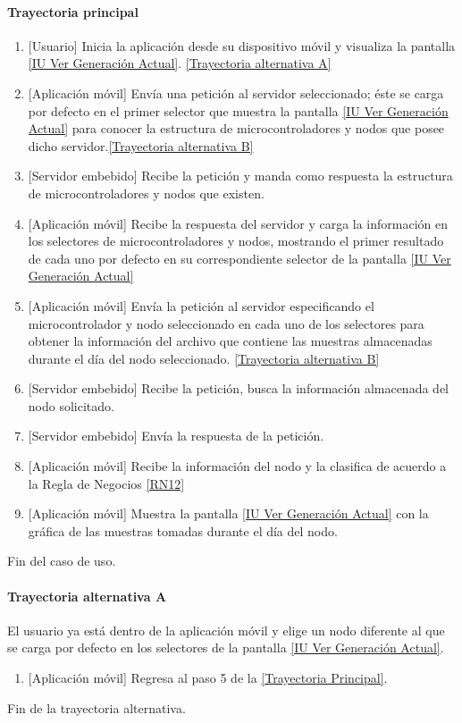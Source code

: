 \paragraph{Trayectoria principal}
    \label{SUB-U-CU1.2:TP}
	\begin{enumerate}
	    \item {[Usuario]} Inicia la aplicación desde su dispositivo móvil y visualiza la pantalla \hyperref[fig:monitoreoReal]{[IU Ver Generación Actual]}. \hyperref[SUB-U-CU1.2:TA]{[Trayectoria alternativa A]}
	    \item {[Aplicación móvil]} Envía una petición al servidor seleccionado; éste se carga por defecto en el primer selector que muestra la pantalla \hyperref[fig:monitoreoReal]{[IU Ver Generación Actual]} para conocer la estructura de microcontroladores y nodos que posee dicho servidor.\hyperref[SUB-U-CU1.2:TB]{[Trayectoria alternativa B]}
	    \item {[Servidor embebido]} Recibe la petición y manda como respuesta la estructura de microcontroladores y nodos que existen.
	    \item {[Aplicación móvil]} Recibe la respuesta del servidor y carga la información en los selectores de microcontroladores y nodos, mostrando el primer resultado de cada uno por defecto en su correspondiente selector de la pantalla \hyperref[fig:monitoreoReal]{[IU Ver Generación Actual]} 
	    \item {[Aplicación móvil]} Envía la petición al servidor especificando el microcontrolador y nodo seleccionado en cada uno de los selectores para obtener la información del archivo que contiene las muestras almacenadas durante el día del nodo seleccionado. \hyperref[SUB-U-CU1.2:TB]{[Trayectoria alternativa B]} 
	    \item {[Servidor embebido]} Recibe la petición, busca la información almacenada del nodo solicitado. 
	    \item {[Servidor embebido]} Envía la respuesta de la petición.
	    \item {[Aplicación móvil]} Recibe la información del nodo y la clasifica de acuerdo a la Regla de Negocios \ref{RN12} 
	    \item {[Aplicación móvil]} Muestra la pantalla \hyperref[fig:monitoreoReal]{[IU Ver Generación Actual]} con la gráfica de las muestras tomadas durante el día del nodo.
	\end{enumerate}
	Fin del caso de uso.

\paragraph{Trayectoria alternativa A} \label{SUB-U-CU1.2:TA}
	El usuario ya está dentro de la aplicación móvil y elige un nodo diferente al que se carga por defecto en los selectores de la pantalla \hyperref[fig:monitoreoReal]{[IU Ver Generación Actual]}.
	\begin{enumerate}[label=A\arabic*.]
		\item {[Aplicación móvil]} Regresa al paso 5 de la \hyperref[SUB-U-CU1.2:TP]{[Trayectoria Principal]}.
	\end{enumerate}
	Fin de la trayectoria alternativa.

